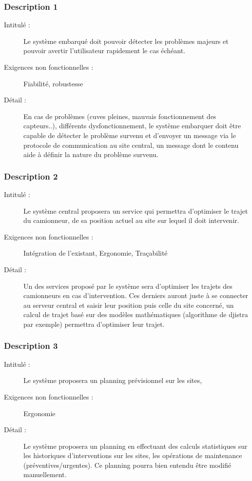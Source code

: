 \documentclass[11pt]{article}
\begin{document}
 \subsubsection {Description 1}
\begin{description}
           \item[Intitulé :] Le système embarqué doit pouvoir détecter les problèmes majeurs et pouvoir avertir l'utilisateur rapidement le cas
échéant.
           \item[Exigences non fonctionnelles :] Fiabilité, robustesse
           \item[Détail :] En cas de problèmes (cuves pleines, mauvais fonctionnement des capteurs..), différents dysfonctionnement,
le système embarquer doit être capable de détecter le problème survenu et d'envoyer un message via le protocole de communication au site central, un message dont le contenu aide à définir la nature du problème survenu.
\end{description}

 \subsubsection {Description 2}
\begin{description}
           \item[Intitulé :] Le système central proposera un service qui permettra d'optimiser le trajet du camionneur, de sa position
actuel au site sur lequel il doit intervenir.
           \item[Exigences non fonctionnelles :] Intégration de l'existant, Ergonomie, Traçabilité
           \item[Détail :] Un des services proposé par le système sera d'optimiser les trajets des camionneurs en cas d'intervention.
Ces derniers auront juste à se connecter au serveur central et saisir leur position puis celle du site concerné,
un calcul de trajet basé sur des modèles mathématiques (algorithme de djistra par exemple) permettra d'optimiser 
leur trajet.
\end{description}

 \subsubsection {Description 3}
\begin{description}
           \item[Intitulé :] Le système proposera un planning prévisionnel sur les sites,
           \item[Exigences non fonctionnelles :] Ergonomie
           \item[Détail :] Le système proposera un planning en effectuant des calculs statistiques sur les historiques d'interventions sur les sites, 
les opérations de maintenance (préventives/urgentes). Ce planning pourra bien entendu être modifié manuellement.
\end{description}
\end{document}
